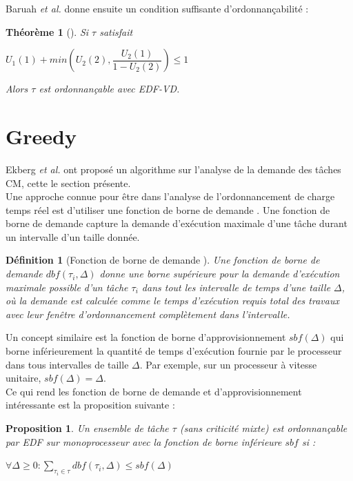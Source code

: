 \documentclass[12pt,a4paper,oneside]{book}
\theoremstyle{break}
\newtheorem{defin}{Définition}[chapter]
\theoremstyle{breakplain}
\newtheorem{theo}{Théorème}[chapter]
\newtheorem{prop}{Proposition}[chapter]
\begin{document}
Baruah \textit{et al.} donne ensuite un condition suffisante d'ordonnançabilité :

\begin{theo}[\cite{BaruahBDMSS11}]
Si $\tau$ satisfait
\begin{center}
$U_1(1) + min \left( U_2(2), \dfrac{U_2(1)}{1-U_2(2)} \right) \le 1$
\end{center}
Alors $\tau$ est ordonnançable avec \textit{EDF-VD}.
\end{theo}

\section{Greedy}
Ekberg \textit{et al.} ont proposé un algorithme sur l'analyse de la demande des tâches CM\cite{ekberg2014bounding}, cette le section présente.\\

Une approche connue pour être dans l'analyse de l'ordonnancement de charge temps réel est d'utiliser une fonction de borne de demande \cite{baruah1990preemptively}. Une fonction de borne de demande capture la demande d'exécution maximale  d'une tâche durant un intervalle d'un taille donnée.

\begin{defin}[Fonction de borne de demande \cite{ekberg2014bounding}]
Une fonction de borne de demande $dbf(\tau_i, \Delta)$ donne une borne supérieure pour la demande d'exécution maximale possible d'un tâche $\tau_i$ dans tout les intervalle de temps d'une taille $\Delta$, où la demande est calculée comme le temps d'exécution requis total des travaux avec leur fenêtre d'ordonnancement complètement dans l'intervalle.
\end{defin}

Un concept similaire est la fonction de borne d'approvisionnement $sbf(\Delta)$ qui borne inférieurement la quantité de temps d'exécution fournie par le processeur dans tous intervalles de taille $\Delta$. Par exemple, sur un processeur à vitesse unitaire, $sbf(\Delta) = \Delta$.\\

Ce qui rend les fonction de borne de demande et d'approvisionnement intéressante est la proposition suivante :

\begin{prop}
\label{greedy:class:dbfsbf}
Un ensemble de tâche $\tau$ (sans criticité mixte) est ordonnançable par \textit{EDF} sur monoprocesseur avec la fonction de borne inférieure $sbf$ si :
\begin{center}
$ \forall \Delta \ge 0 : \underset{\tau_i \in \tau}{\sum}dbf(\tau_i, \Delta) \le sbf(\Delta)$
\end{center}
\end{prop}
\end{document}
